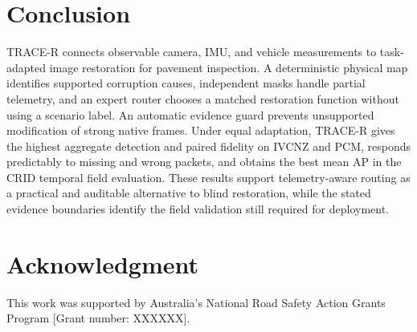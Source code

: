 \documentclass[journal]{IEEEtran}
\begin{document}
\section{Conclusion}
TRACE-R connects observable camera, IMU, and vehicle measurements to task-adapted image restoration for pavement inspection. A deterministic physical map identifies supported corruption causes, independent masks handle partial telemetry, and an expert router chooses a matched restoration function without using a scenario label. An automatic evidence guard prevents unsupported modification of strong native frames. Under equal adaptation, TRACE-R gives the highest aggregate detection and paired fidelity on IVCNZ and PCM, responds predictably to missing and wrong packets, and obtains the best mean AP in the CRID temporal field evaluation. These results support telemetry-aware routing as a practical and auditable alternative to blind restoration, while the stated evidence boundaries identify the field validation still required for deployment.

\section*{Acknowledgment}
This work was supported by Australia's National Road Safety Action Grants Program [Grant number: XXXXXX].

\clearpage
\footnotesize


\end{document}
